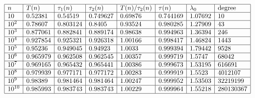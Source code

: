 \documentclass[11pt]{article}
\theoremstyle{definition}
\theoremstyle{remark}
\numberwithin{equation}{section}
\begin{document}
\begin{table}[h]
$$\begin{array}{|l|l|l|l|l|l|l|l|}
\hline
n & T(n) & \tau_1(n) & \tau_2(n) & T(n)/\tau_2(n) & \tau(n) & \lambda_0 & \text{degree}\\
\hline 
10 &  0.52381 & 0.54519 & 0.749627 & 0.69876 & 0.744169 & 1.07692 & 10\\
\hline
10^2 & 0.78607 & 0.803124 & 0.8405 & 0.93524 & 0.980285 & 1.27909 & 43\\
\hline
10^3 & 0.877061 & 0.882841 & 0.889174 & 0.98638 & 0.994963 & 1.36394 & 246\\
\hline
10^4 & 0.927854 & 0.925321 & 0.926318 & 1.00166 & 0.998417 & 1.46824 & 1443\\
\hline
10^5 & 0.95236 & 0.949045 & 0.94923 & 1.0033 & 0.999394 & 1.79442 & 9528\\
\hline
10^6 & 0.965979 & 0.962508 & 0.962545 & 1.00357 & 0.999719 & 1.5747 & 68042\\
\hline
10^7 & 0.969165 & 0.965432 & 0.965441 & 1.00386 & 0.999673 & 1.53195 & 616691\\
\hline 
10^8 & 0.979939 & 0.977171 & 0.977172 & 1.00283 & 0.999919 & 1.5523 & 4012107 \\
\hline
10^9 & 0.98389 & 0.981464 & 0.981464 & 1.00247 & 0.999952 & 1.53503 & 32219199 \\
\hline
10^{10} & 0.985993 & 0.983743 & 0.983743 & 1.00229 & 0.999964 & 1.55218 & 280130367\\
\hline
\end{array}$$
\caption{Values of $T(n)$, $\tau_1(n),\tau_2(n),\tau(n)$, $\lambda_0$ and degree$(x)$ for $x=12n+6$.}\label{tabtetan6}
\end{table}

\vspace{1em}
\end{document}
